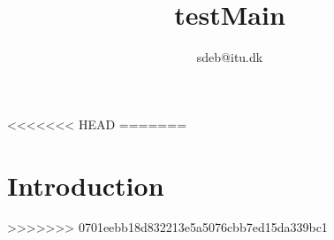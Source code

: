 \documentclass[10pt,a4paper]{article}
\author{sdeb@itu.dk}
\title{testMain}
\begin{document}
<<<<<<< HEAD
=======
\tableofcontents
\newpage
\part{Introduction}


>>>>>>> 0701eebb18d832213e5a5076cbb7ed15da339bc1

\end{document}
